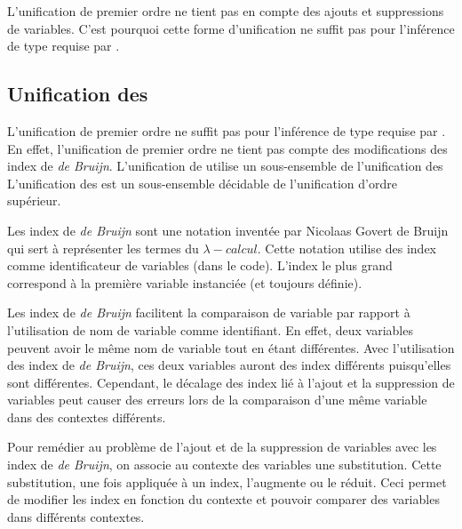                 L'unification de premier ordre ne tient pas en compte des ajouts et suppressions de variables. C'est pourquoi cette forme d'unification ne suffit
                pas pour l'inférence de type requise par \typer{}.

        \subsection{Unification des \hop{}}
            \structpar{\hop{}}
                L'unification de premier ordre ne suffit pas pour l'inférence de type requise par \typer{}.
                En effet, l'unification de premier ordre ne tient pas compte des modifications des index de \textit{de Bruijn}.
                L'unification de \typer{} utilise un sous-ensemble de l'unification des \hop{}
                L'unification des \hop{} est un sous-ensemble décidable de l'unification d'ordre supérieur.

                Les index de \textit{de Bruijn} sont une notation inventée par Nicolaas Govert de Bruijn qui sert à représenter les
                termes du $\lambda{}-calcul$. Cette notation utilise des index comme identificateur de variables (dans le code). L'index le plus grand
                correspond à la première variable instanciée (et toujours définie).

                Les index de \textit{de Bruijn} facilitent la comparaison de variable par rapport à l'utilisation de nom de variable comme identifiant.
                En effet, deux variables peuvent avoir le même nom de variable tout en étant différentes. Avec l'utilisation des index de \textit{de Bruijn},
                ces deux variables auront des index différents puisqu'elles sont différentes.
                Cependant, le décalage des index lié à l'ajout et la suppression de variables peut causer des erreurs lors de la comparaison d'une même
                variable dans des contextes différents.

                Pour remédier au problème de l'ajout et de la suppression de variables avec les index de \textit{de Bruijn}, on associe au contexte des
                variables une substitution. Cette substitution, une fois appliquée à un index, l'augmente ou le réduit.
                Ceci permet de modifier les index en fonction du contexte et pouvoir comparer des variables dans différents contextes.

